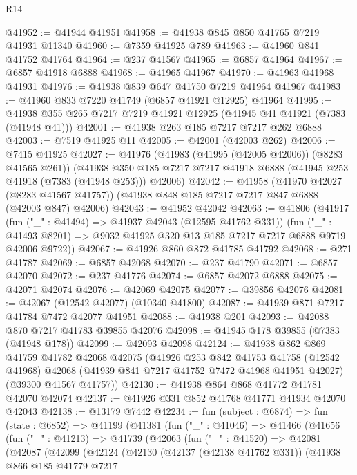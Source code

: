 \begin{lexlean}{R14}
\begin{coremodule}
@41952 := @41944 @41951
@41958 := @41938 @845 @850 @41765 @7219 @41931 @11340
@41960 := @7359 @41925 @789
@41963 := @41960 @841 @41752 @41764
@41964 := @237 @41567
@41965 := @6857 @41964
@41967 := @6857 @41918 @6888
@41968 := @41965 @41967
@41970 := @41963 @41968 @41931
@41976 := @41938 @839 @647 @41750 @7219 @41964 @41967
@41983 := @41960 @833 @7220 @41749 (@6857 @41921 @12925) @41964
@41995 := @41938 @355 @265 @7217 @7219 @41921 @12925 (@41945 @41 @41921 (@7383 (@41948 @41)))
@42001 := @41938 @263 @185 @7217 @7217 @262 @6888
@42003 := @7519 @41925 @11
@42005 := @42001 (@42003 @262)
@42006 := @7415 @41925
@42027 := @41976
    (@41983 (@41995 (@42005 @42006)) (@8283 @41565 @261))
    (@41938 @350 @185 @7217 @7217 @41918 @6888 (@41945 @253 @41918 (@7383 (@41948 @253))) @42006)
@42042 := @41958
    (@41970 @42027 (@8283 @41567 @41757))
    (@41938 @848 @185 @7217 @7217 @847 @6888 (@42003 @847) @42006)
@42043 := @41952 @42042
@42063 := @41806
    (@41917
      (fun ("_" : @41494) => @41937 @42043 (@12595 @41762 @331))
      (fun ("_" : @41493 @8201) => @9032 @41925 @320 @13 @185 @7217 @7217 @6888 @9719 @42006 @9722))
@42067 := @41926 @860 @872 @41785 @41792
@42068 := @271 @41787
@42069 := @6857 @42068
@42070 := @237 @41790
@42071 := @6857 @42070
@42072 := @237 @41776
@42074 := @6857 @42072 @6888
@42075 := @42071 @42074
@42076 := @42069 @42075
@42077 := @39856 @42076
@42081 := @42067 (@12542 @42077) (@10340 @41800)
@42087 := @41939 @871 @7217 @41784 @7472 @42077 @41951
@42088 := @41938 @201
@42093 := @42088 @870 @7217 @41783 @39855 @42076
@42098 := @41945 @178 @39855 (@7383 (@41948 @178))
@42099 := @42093 @42098
@42124 := @41938
    @862
    @869
    @41759
    @41782
    @42068
    @42075
    (@41926
      @253
      @842
      @41753
      @41758
      (@12542 @41968)
      @42068
      (@41939 @841 @7217 @41752 @7472 @41968 @41951 @42027)
      (@39300 @41567 @41757))
@42130 := @41938 @864 @868 @41772 @41781 @42070 @42074
@42137 := @41926 @331 @852 @41768 @41771 @41934 @42070 @42043
@42138 := @13179 @7442
@42234 := fun (subject : @6874) =>
  fun (state : @6852) =>
  @41199
    (@41381
      (fun ("_" : @41046) =>
      @41466
        (@41656
          (fun ("_" : @41213) =>
          @41739
            (@42063
              (fun ("_" : @41520) =>
              @42081
                (@42087
                  (@42099
                    (@42124
                      (@42130
                        (@42137 (@42138 @41762 @331))
                        (@41938
                          @866
                          @185
                          @41779
                          @7217

\end{coremodule}
\end{lexlean}
